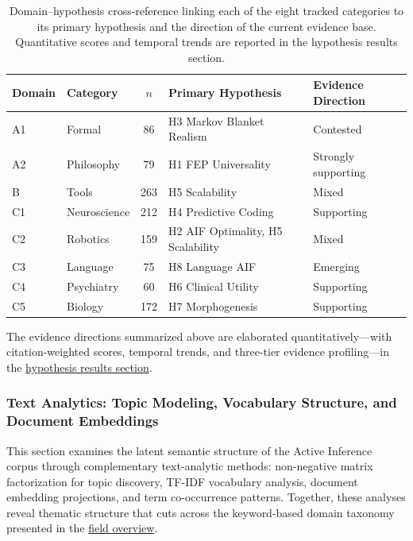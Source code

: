 \documentclass[
  english,
]{article}
\begin{document}
\begin{table}[htbp]
\centering
\caption{Domain--hypothesis cross-reference linking each of the eight tracked categories to its primary hypothesis and the direction of the current evidence base. Quantitative scores and temporal trends are reported in the hypothesis results section.}
\label{tab:domain_hypothesis_crossref}
\begin{tabular}{llcll}
\toprule
\textbf{Domain} & \textbf{Category} & $n$ & \textbf{Primary Hypothesis} & \textbf{Evidence Direction} \\
\midrule
A1 & Formal & 86 & H3 Markov Blanket Realism & Contested \\
A2 & Philosophy & 79 & H1 FEP Universality & Strongly supporting \\
B & Tools & 263 & H5 Scalability & Mixed \\
C1 & Neuroscience & 212 & H4 Predictive Coding & Supporting \\
C2 & Robotics & 159 & H2 AIF Optimality, H5 Scalability & Mixed \\
C3 & Language & 75 & H8 Language AIF & Emerging \\
C4 & Psychiatry & 60 & H6 Clinical Utility & Supporting \\
C5 & Biology & 172 & H7 Morphogenesis & Supporting \\
\bottomrule
\end{tabular}
\end{table}

The evidence directions summarized above are elaborated
quantitatively---with citation-weighted scores, temporal trends, and
three-tier evidence profiling---in the
\hyperref[sec:hypothesis_results]{hypothesis results section}.

\newpage

\subsubsection{Text Analytics: Topic Modeling, Vocabulary Structure, and
Document Embeddings}\label{sec:text_analytics}

This section examines the latent semantic structure of the Active
Inference corpus through complementary text-analytic methods:
non-negative matrix factorization for topic discovery, TF-IDF vocabulary
analysis, document embedding projections, and term co-occurrence
patterns. Together, these analyses reveal thematic structure that cuts
across the keyword-based domain taxonomy presented in the
\hyperref[sec:field_overview]{field overview}.
\end{document}
